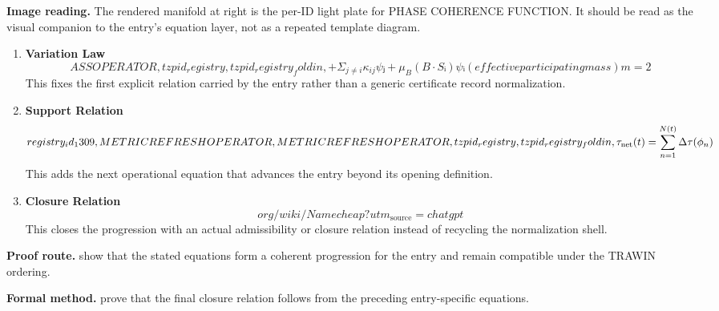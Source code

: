 \begin{samepage}
\noindent\begin{minipage}[t]{0.45\linewidth}
\vspace{0pt}
\raggedright
\scriptsize\textbf{Image reading.} The rendered manifold at right is the per-ID light plate for PHASE COHERENCE FUNCTION. It should be read as the visual companion to the entry's equation layer, not as a repeated template diagram.\par
\end{minipage}\hfill
\begin{minipage}[t]{0.53\linewidth}
\vspace*{-0.10in}
\raggedright
{}
\end{minipage}
\end{samepage}

\clearpage


\begin{enumerate}[leftmargin=1.6em,itemsep=9pt,topsep=6pt]
\item \textbf{Variation Law}
\[
ASS OPERATOR,tzpid_registry,tzpid_registry_foldin,+ Σ_{j ≠ i} κ_{ij} ψⱼ + μ_B (B·Sᵢ) ψᵢ (effective participating mass) m = 2
\]
This fixes the first explicit relation carried by the entry rather than a generic certificate record normalization.

\item \textbf{Support Relation}
\[
registry_id_1309,METRIC REFRESH OPERATOR,METRIC REFRESH OPERATOR,tzpid_registry,tzpid_registry_foldin,\tau_{\rm net}(t) = \sum_{n=1}^{N(t)} \Delta \tau(\phi_n)
\]
This adds the next operational equation that advances the entry beyond its opening definition.

\item \textbf{Closure Relation}
\[
org/wiki/Namecheap?utm_{\mathrm{source}}=chatgpt
\]
This closes the progression with an actual admissibility or closure relation instead of recycling the normalization shell.
\end{enumerate}

\textbf{Proof route.} show that the stated equations form a coherent progression for the entry and remain compatible under the TRAWIN ordering.

\textbf{Formal method.} prove that the final closure relation follows from the preceding entry-specific equations.

